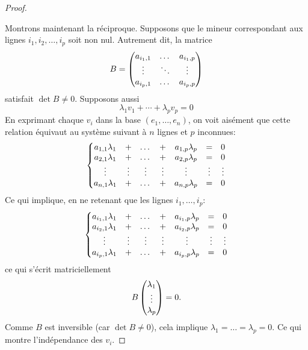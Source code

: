 \documentclass[class=report,crop=false]{standalone}
\begin{document}
\begin{proof}
\begin{itemize}
\end{itemize}

\bigskip

Montrons maintenant la réciproque. Supposons que le mineur correspondant aux lignes
$i_1,i_2,\ldots,i_p$ soit non nul. Autrement dit, la matrice
\[
B=\begin{pmatrix}
a_{i_{1},1}& \dots & a_{i_{1},p} \cr
\vdots & \ddots& \vdots    \cr
a_{i_{p},1}& \dots & a_{i_{p},p} \cr
\end{pmatrix}
\]
satisfait $\det B \neq 0$. Supposons aussi
$$\lambda_1 v_1+ \cdots + \lambda_p v_p = 0$$
En exprimant chaque $v_i$ dans la base $(e_1, \ldots, e_n)$, on
voit aisément que cette relation équivaut au système suivant à $n$ lignes et
$p$ inconnues:
$$\left \{\begin{matrix}
a_{1,1}\lambda_{1}&+& \dots&+ & a_{1,p}\lambda_{p}& = & 0 \cr
a_{2,1}\lambda_{1}&+& \dots &+ & a_{2,p}\lambda_{p}& = & 0 \cr
\vdots &\vdots & \vdots & \vdots & \vdots& \vdots   & \vdots    \cr
a_{n,1}\lambda_{1}&+& \dots &+& a_{n,p}\lambda_{p}& =&0 \cr
\end{matrix}\right .$$
Ce qui implique, en ne retenant que les lignes $i_1,\ldots,i_p$:
$$\left \{\begin{matrix}
a_{i_{1},1}\lambda_{1}&+& \dots &+& a_{i_{1},p}\lambda_{p}& = & 0 \cr
a_{i_{2},1}\lambda_{1}&+& \dots &+& a_{i_{2},p}\lambda_{p}& = & 0 \cr
\vdots & \vdots &\vdots & \vdots & \vdots  & \vdots &\vdots    \cr
a_{i_{p},1}\lambda_{1}&+& \dots &+& a_{i_{p},p}\lambda_{p}& =&0 \cr
\end{matrix}\right .$$
ce qui s'écrit matriciellement
$$B\begin{pmatrix}
\lambda_{1}\cr
\vdots \cr
\lambda_{p}\cr
\end{pmatrix}=0.$$
Comme $B$ est inversible (car $\det B \neq 0$), cela implique $\lambda_{1}=\dots
=\lambda_{p}=0$. Ce qui montre l'indépendance des $v_i$.
\end{proof}



\end{document}
